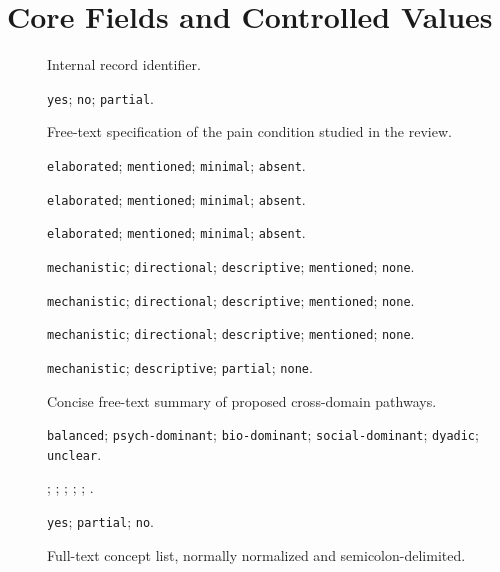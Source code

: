 \documentclass[11pt]{article}
\begin{document}
\section*{Core Fields and Controlled Values}
\begin{description}
\item[] Internal record identifier.
\item[] \texttt{yes}; \texttt{no}; \texttt{partial}.
\item[] Free-text specification of the pain condition studied in the review.
\item[] \texttt{elaborated}; \texttt{mentioned}; \texttt{minimal}; \texttt{absent}.
\item[] \texttt{elaborated}; \texttt{mentioned}; \texttt{minimal}; \texttt{absent}.
\item[] \texttt{elaborated}; \texttt{mentioned}; \texttt{minimal}; \texttt{absent}.
\item[] \texttt{mechanistic}; \texttt{directional}; \texttt{descriptive}; \texttt{mentioned}; \texttt{none}.
\item[] \texttt{mechanistic}; \texttt{directional}; \texttt{descriptive}; \texttt{mentioned}; \texttt{none}.
\item[] \texttt{mechanistic}; \texttt{directional}; \texttt{descriptive}; \texttt{mentioned}; \texttt{none}.
\item[] \texttt{mechanistic}; \texttt{descriptive}; \texttt{partial}; \texttt{none}.
\item[] Concise free-text summary of proposed cross-domain pathways.
\item[] \texttt{balanced}; \texttt{psych-dominant}; \texttt{bio-dominant}; \texttt{social-dominant}; \texttt{dyadic}; \texttt{unclear}.
\item[] ; ; ; ; ; .
\item[] \texttt{yes}; \texttt{partial}; \texttt{no}.
\item[] Full-text concept list, normally normalized and semicolon-delimited.

\end{description}
\end{document}
